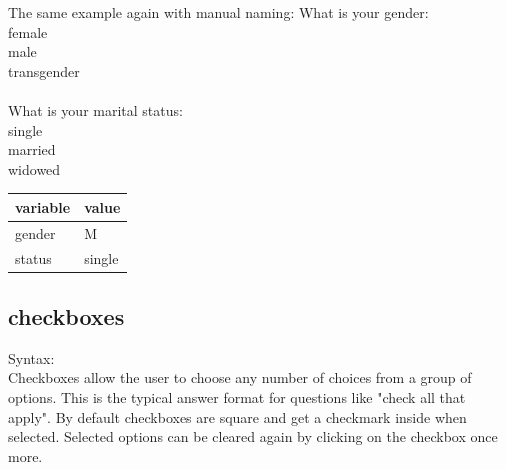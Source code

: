 \documentclass[12pt]{article} %
\begin{document}
\begin{exampleResultBox}{The same example again with manual naming:}
What is your gender: \\
\kw{[@RB GROUP="gender" VALUE="F"@]} female\\
\kw{[@RB VALUE="M"@]} male \\
\kw{[@RB VALUE="T"@]} transgender \\
\\
What is your marital status:\\
\kw{[@RB GROUP="status" VALUE="single"@]} single\\
\kw{[@RB VALUE="married"@]} married\\
\kw{[@RB VALUE="widowed"@]} widowed
\tcblower
{}
\begin{tabular}{l|l}
\textbf{variable} & \textbf{value} \\
\hline
gender & M\\
status & single\\
\end{tabular}
\end{exampleResultBox}

\subsection{checkboxes}\label{subsec:checkboxes}

Syntax:\hspace{0.5cm}\kw{[@CB ... @]} \\

Checkboxes allow the user to choose any number of choices from a group of options.
This is the typical answer format for questions like "check all that apply".
By default checkboxes are square and get a checkmark inside when selected.
Selected options can be cleared again by clicking on the checkbox once more.
\end{document}
